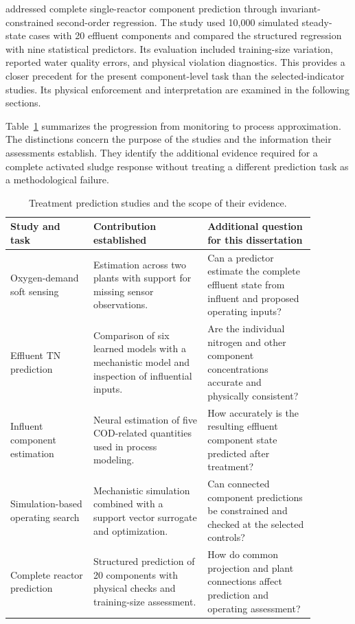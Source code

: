 \citet{Selerio2026} addressed complete single-reactor component prediction through invariant-constrained second-order regression. The study used 10,000 simulated steady-state cases with 20 effluent components and compared the structured regression with nine statistical predictors. Its evaluation included training-size variation, reported water quality errors, and physical violation diagnostics. This provides a closer precedent for the present component-level task than the selected-indicator studies. Its physical enforcement and interpretation are examined in the following sections.

Table~\ref{tab:rrl_prediction_evidence} summarizes the progression from monitoring to process approximation. The distinctions concern the purpose of the studies and the information their assessments establish. They identify the additional evidence required for a complete activated sludge response without treating a different prediction task as a methodological failure.

\begin{table}[htbp]
\centering\footnotesize
\caption{Treatment prediction studies and the scope of their evidence.}
\label{tab:rrl_prediction_evidence}
\begin{tabular}{>{\raggedright\arraybackslash}p{0.24\linewidth}>{\raggedright\arraybackslash}p{0.33\linewidth}>{\raggedright\arraybackslash}p{0.31\linewidth}}
\toprule Study and task & Contribution established & Additional question for this dissertation\\\midrule
\citet{Ching2022}\newline Oxygen-demand soft sensing & Estimation across two plants with support for missing sensor observations. & Can a predictor estimate the complete effluent state from influent and proposed operating inputs?\\
\citet{Wang2025}\newline Effluent TN prediction & Comparison of six learned models with a mechanistic model and inspection of influential inputs. & Are the individual nitrogen and other component concentrations accurate and physically consistent?\\
\citet{Wang2024}\newline Influent component estimation & Neural estimation of five COD-related quantities used in process modeling. & How accurately is the resulting effluent component state predicted after treatment?\\
\citet{Fang2011}\newline Simulation-based operating search & Mechanistic simulation combined with a support vector surrogate and optimization. & Can connected component predictions be constrained and checked at the selected controls?\\
\citet{Selerio2026}\newline Complete reactor prediction & Structured prediction of 20 components with physical checks and training-size assessment. & How do common projection and plant connections affect prediction and operating assessment?\\
\bottomrule
\end{tabular}
\end{table}

